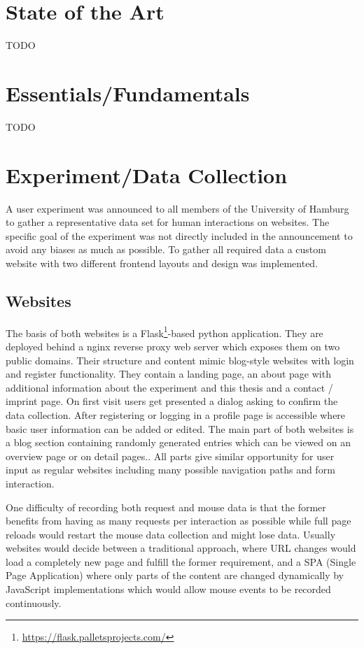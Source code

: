 \documentclass[
    fontsize=12pt,
    headings=small,
    parskip=half,           %
    bibliography=totoc,
    numbers=noenddot,       %
    open=any,               %
    final                   %
    ]{scrreprt}
\begin{document}
\chapter{State of the Art}
TODO

\chapter{Essentials/Fundamentals}
TODO

\chapter{Experiment/Data Collection}

A user experiment was announced to all members of the University of Hamburg to gather a representative data set for human interactions on websites. The specific goal of the experiment was not directly included in the announcement to avoid any biases as much as possible. To gather all required data a custom website with two different frontend layouts and design was implemented.

\section{Websites}

The basis of both websites is a Flask\footnote{\url{https://flask.palletsprojects.com/}}-based python application. They are deployed behind a nginx reverse proxy web server which exposes them on two public domains. Their structure and content mimic blog-style websites with login and register functionality. They contain a landing page, an about page with additional information about the experiment and this thesis and a contact / imprint page.
On first visit users get presented a dialog asking to confirm the data collection.
After registering or logging in a profile page is accessible where basic user information can be added or edited. The main part of both websites is a blog section containing randomly generated entries which can be viewed on an overview page or on detail pages..
All parts give similar opportunity for user input as regular websites including many possible navigation paths and form interaction.

One difficulty of recording both request and mouse data is that the former benefits from having as many requests per interaction as possible while full page reloads would restart the mouse data collection and might lose data. Usually websites would decide between a traditional approach, where URL changes would load a completely new page and fulfill the former requirement, and a SPA (Single Page Application) where only parts of the content are changed dynamically by JavaScript implementations which would allow mouse events to be recorded continuously.
\end{document}
